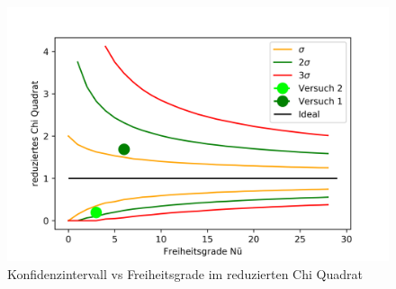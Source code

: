 \begin{figure}[!ht]
	\centering								 
	\includegraphics[width=350pt]{fotos/gpr1/Konfidenzintervall vs Freiheitsgrade im reduzierten Chi Quadrat.png}			 
	\caption{Konfidenzintervall vs Freiheitsgrade im reduzierten Chi Quadrat}							 
	\label{Konfidenzintervall vs Freiheitsgrade im reduzierten Chi Quadrat}							 
\end{figure}

